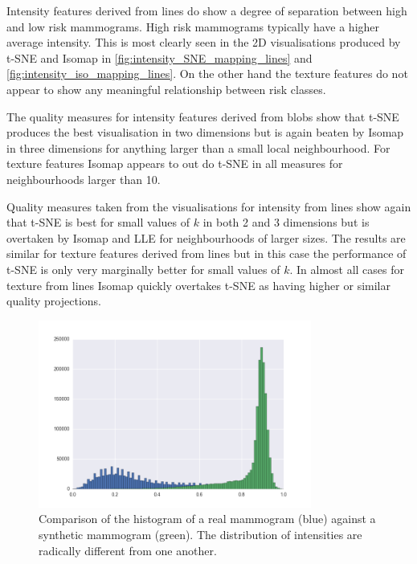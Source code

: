 Intensity features derived from lines do show a degree of separation between high and low risk mammograms. High risk mammograms typically have a higher average intensity. This is most clearly seen in the 2D visualisations produced by t-SNE and Isomap in \ref{fig:intensity_SNE_mapping_lines} and \ref{fig:intensity_iso_mapping_lines}. On the other hand the texture features do not appear to show any meaningful relationship between risk classes.

The quality measures for intensity features derived from blobs show that t-SNE produces the best visualisation in two dimensions but is again beaten by Isomap in three dimensions for anything larger than a small local neighbourhood. For texture features Isomap appears to out do t-SNE in all measures for neighbourhoods larger than 10.

Quality measures taken from the visualisations for intensity from lines show again that t-SNE is best for small values of $k$ in both 2 and 3 dimensions but is overtaken by Isomap and LLE for neighbourhoods of larger sizes. The results are similar for texture features derived from lines but in this case the performance of t-SNE is only very marginally better for small values of $k$. In almost all cases for texture from lines Isomap quickly overtakes t-SNE as having higher or similar quality projections.


\begin{figure}[H]
	\label{fig:mammogram-histogram}
	\centering
	\includegraphics[width=0.8\textwidth]{Images/inverted_hist.png}	
	\caption{Comparison of the histogram of a real mammogram (blue) against a synthetic mammogram (green). The distribution of intensities are radically different from one another.}
\end{figure}

